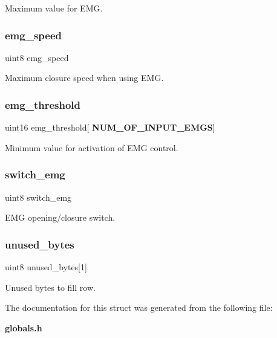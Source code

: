 Maximum value for E\+MG. \mbox{\label{structst__emg_ae8e800591064bf14eb2dd3a3fb2c325b}} 
\subsubsection{emg\+\_\+speed}
{\footnotesize\ttfamily uint8 emg\+\_\+speed}

Maximum closure speed when using E\+MG. \mbox{\label{structst__emg_aa406dc76b9d1c8741dc42db9ac4dab51}} 
\subsubsection{emg\+\_\+threshold}
{\footnotesize\ttfamily uint16 emg\+\_\+threshold[\textbf{ N\+U\+M\+\_\+\+O\+F\+\_\+\+I\+N\+P\+U\+T\+\_\+\+E\+M\+GS}]}

Minimum value for activation of E\+MG control. \mbox{\label{structst__emg_a90c7b59f97a26bf3da8b26b145b32919}} 
\subsubsection{switch\+\_\+emg}
{\footnotesize\ttfamily uint8 switch\+\_\+emg}

E\+MG opening/closure switch. \mbox{\label{structst__emg_ac60066bd7150d73c95439a5e2af21e05}} 
\subsubsection{unused\+\_\+bytes}
{\footnotesize\ttfamily uint8 unused\+\_\+bytes[1]}

Unused bytes to fill row. 

The documentation for this struct was generated from the following file\+:\begin{DoxyCompactItemize}
\item 
\textbf{ globals.\+h}\end{DoxyCompactItemize}
